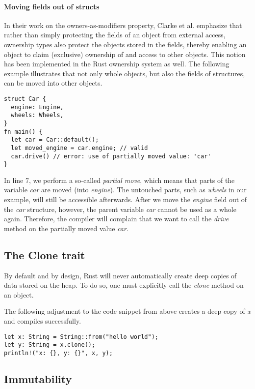 \documentclass[sigplan,11pt,nonacm]{acmart}
\begin{document}
\paragraph{Moving fields out of structs}

In their work on the owners-as-modifiers property, Clarke et al. \cite{ownership-types-survey} emphasize that rather than simply protecting the fields of an object from external access, ownership types also protect the objects stored in the fields, thereby enabling an object to claim (exclusive) ownership of and access to other objects.
This notion has been implemented in the Rust ownership system as well.
The following example illustrates that not only whole objects, but also the fields of structures, can be moved into other objects.

\begin{lstlisting}
struct Car {
  engine: Engine,
  wheels: Wheels,
}
fn main() {
  let car = Car::default();
  let moved_engine = car.engine; // valid
  car.drive() // error: use of partially moved value: 'car'
}
\end{lstlisting}

In line 7, we perform a so-called \emph{partial move}, which means that parts of the variable \emph{car} are moved (into \emph{engine}).
The untouched parts, such as \emph{wheels} in our example, will still be accessible afterwards.
After we move the \emph{engine} field out of the \emph{car} structure, however, the parent variable \emph{car} cannot be used as a whole again.
Therefore, the compiler will complain that we want to call the \emph{drive} method on the partially moved value \emph{car}.


\subsection{The Clone trait}
\label{sec:rust-clone-trait}

By default and by design, Rust will never automatically create deep copies of data stored on the heap.
To do so, one must explicitly call the \emph{clone} method on an object.

The following adjustment to the code snippet from above creates a deep copy of \emph{x} and compiles successfully.
\begin{lstlisting}
let x: String = String::from("hello world");
let y: String = x.clone();
println!("x: {}, y: {}", x, y);
\end{lstlisting}


\subsection{Immutability}
\label{sec:rust-immutability}
\end{document}
